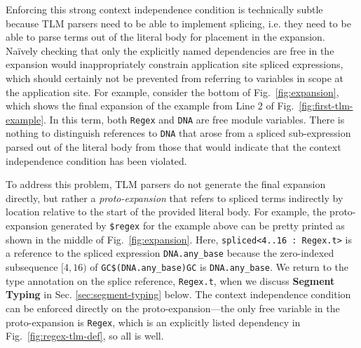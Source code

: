 \documentclass[acmsmall,screen]{acmart}
\newcommand{\li}[1]{\lstinline[basicstyle=\ttfamily\fontsize{9pt}{1em}\selectfont]{#1}}
\newcommand{\lismall}[1]{\lstinline[basicstyle=\ttfamily\fontsize{9pt}{1em}\selectfont]{#1}}
\begin{document}
Enforcing this strong context independence condition is technically subtle because TLM parsers need to be able to implement splicing, i.e. they need to be able to parse  terms out of the literal body for placement in the expansion. Na\"ively checking that only the explicitly named dependencies are free in the expansion would inappropriately constrain application site spliced expressions, which should certainly not be prevented from referring to variables in scope at the application site. For example, consider the  bottom of Fig.~\ref{fig:expansion}, which shows the final expansion of the example from Line 2 of Fig.~\ref{fig:first-tlm-example}. 
In this term, both \li{Regex} and \li{DNA} are free module variables. There is nothing to distinguish references to \li{DNA} that arose from a spliced sub-expression parsed out of the literal body from those that would indicate that the context independence condition has been violated. 

To address this problem, TLM parsers do not generate the final expansion directly, but rather a \emph{proto-expansion} that refers to spliced terms indirectly by location relative to the start of the provided literal body. For example, the proto-expansion generated by \li{$regex} for the example above can be pretty printed as shown in the middle of Fig.~\ref{fig:expansion}. 
Here, \lismall{spliced<4..16 : Regex.t>} is a reference to the spliced expression \li{DNA.any_base} because the zero-indexed subsequence $[4, 16)$ of \lismall{GC$(DNA.any_base)GC} is \lismall{DNA.any_base}. We return to the type annotation on the splice reference, \li{Regex.t}, when we discuss \textbf{Segment Typing} in Sec. \ref{sec:segment-typing} below. The context independence condition can be enforced directly on the proto-expansion---the only free variable in the proto-expansion is \li{Regex}, which is an explicitly listed dependency in Fig.~\ref{fig:regex-tlm-def}, so all is well. 
\end{document}
